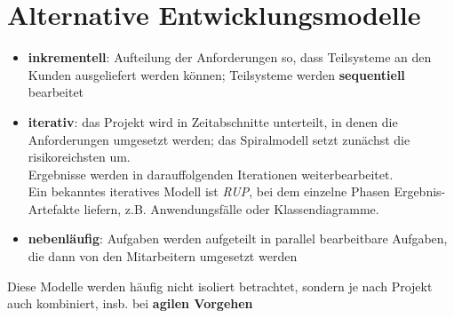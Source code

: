 \section{Alternative Entwicklungsmodelle}

\begin{tcolorbox}[title=Alternative Entwicklungsmodelle]
    \begin{itemize}
        \item \textbf{inkrementell}: Aufteilung der Anforderungen so, dass Teilsysteme an den Kunden ausgeliefert werden können; Teilsysteme werden \textbf{sequentiell} bearbeitet
        \item \textbf{iterativ}: das Projekt wird in Zeitabschnitte unterteilt, in denen die Anforderungen umgesetzt werden; das Spiralmodell  setzt zunächst die risikoreichsten um.\\
        Ergebnisse werden in darauffolgenden Iterationen weiterbearbeitet.\\
        Ein bekanntes iteratives Modell ist \textit{RUP}, bei dem einzelne Phasen Ergebnis-Artefakte liefern, z.B. Anwendungsfälle oder Klassendiagramme.
        \item \textbf{nebenläufig}: Aufgaben werden aufgeteilt in parallel bearbeitbare Aufgaben, die dann von den Mitarbeitern umgesetzt werden
    \end{itemize}

    \noindent
    Diese Modelle werden häufig nicht isoliert betrachtet, sondern je nach Projekt auch kombiniert, insb. bei \textbf{agilen Vorgehen}
\end{tcolorbox}
